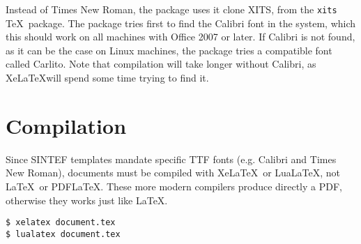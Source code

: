 \documentclass{sintefdoc}
\begin{document}
Instead of Times New Roman, the package uses it clone XITS,
from the \texttt{xits} \TeX\ package. The package tries first to find the Calibri
font in the system, which this should work on all machines with Office 2007 or
later. If Calibri is not found, as it can be the case on Linux machines, the
package tries a compatible font called Carlito.
Note that compilation will take longer without Calibri, as Xe\LaTeX will spend some
time trying to find it.

\section{Compilation}
Since SINTEF templates mandate specific TTF fonts (e.g. Calibri and Times New
Roman), documents must be compiled with Xe\LaTeX\ or Lua\LaTeX, not \LaTeX\ or
PDF\LaTeX.
These more modern compilers produce directly a PDF, otherwise they works just
like \LaTeX.

\begin{verbatim}
$ xelatex document.tex
$ lualatex document.tex
\end{verbatim}
\end{document}
